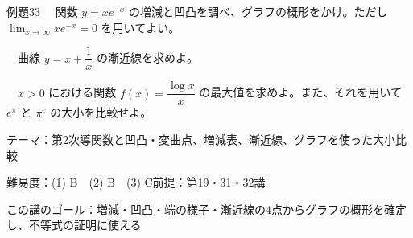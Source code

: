 \documentclass[paper=b5j, fontsize=8pt, fleqn, twoside]{jlreq}
\begin{document}
\begin{ascolorbox4A}[出典：オリジナル]{例題33}
  　関数 $y=xe^{-x}$ の増減と凹凸を調べ、グラフの概形をかけ。ただし $\displaystyle\lim_{x\to\infty}xe^{-x}=0$ を用いてよい。\par
  　曲線 $y=x+\dfrac1x$ の漸近線を求めよ。\par
  　$x>0$ における関数 $f(x)=\dfrac{\log x}x$ の最大値を求めよ。また、それを用いて $e^\pi$ と $\pi^e$ の大小を比較せよ。
\end{ascolorbox4A}

\begin{Data}
  テーマ：第2次導関数と凹凸・変曲点、増減表、漸近線、グラフを使った大小比較\par
  難易度：(1) B　(2) B　(3) C\quad 前提：第19・31・32講\par
  この講のゴール：増減・凹凸・端の様子・漸近線の4点からグラフの概形を確定し、不等式の証明に使える
\end{Data}
\end{document}

